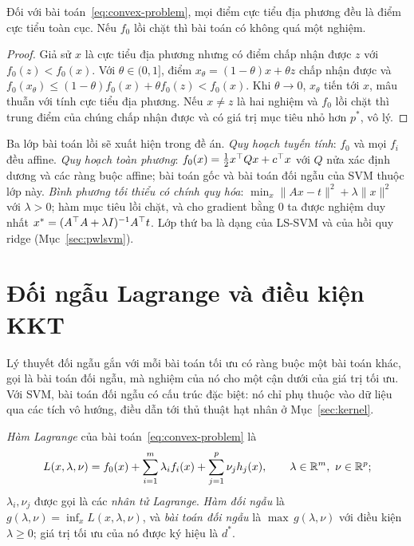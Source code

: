\begin{theorem}\label{thm:local-global}
Đối với bài toán~\eqref{eq:convex-problem}, mọi điểm cực tiểu địa phương đều là điểm cực tiểu toàn cục. Nếu $f_0$ lồi chặt thì bài toán có không quá một nghiệm.
\end{theorem}

\begin{proof}
Giả sử $x$ là cực tiểu địa phương nhưng có điểm chấp nhận được $z$ với $f_0(z)<f_0(x)$. Với $\theta\in(0,1]$, điểm $x_\theta=(1-\theta)x+\theta z$ chấp nhận được và $f_0(x_\theta)\le(1-\theta)f_0(x)+\theta f_0(z)<f_0(x)$. Khi $\theta\to0$, $x_\theta$ tiến tới $x$, mâu thuẫn với tính cực tiểu địa phương. Nếu $x\neq z$ là hai nghiệm và $f_0$ lồi chặt thì trung điểm của chúng chấp nhận được và có giá trị mục tiêu nhỏ hơn $p^\ast$, vô lý.
\end{proof}

Ba lớp bài toán lồi sẽ xuất hiện trong đề án. \emph{Quy hoạch tuyến tính}: $f_0$ và mọi $f_i$ đều affine. \emph{Quy hoạch toàn phương}: $f_0(x)=\frac12x^\top Qx+c^\top x$ với $Q$ nửa xác định dương và các ràng buộc affine; bài toán gốc và bài toán đối ngẫu của SVM thuộc lớp này. \emph{Bình phương tối thiểu có chính quy hóa}: $\min_x\|Ax-t\|^2+\lambda\|x\|^2$ với $\lambda>0$; hàm mục tiêu lồi chặt, và cho gradient bằng $0$ ta được nghiệm duy nhất $x^\ast=(A^\top A+\lambda I)^{-1}A^\top t$. Lớp thứ ba là dạng của LS-SVM và của hồi quy ridge (Mục~\ref{sec:pwlsvm}).

\section{Đối ngẫu Lagrange và điều kiện KKT}\label{sec:duality}

Lý thuyết đối ngẫu gắn với mỗi bài toán tối ưu có ràng buộc một bài toán khác, gọi là bài toán đối ngẫu, mà nghiệm của nó cho một cận dưới của giá trị tối ưu. Với SVM, bài toán đối ngẫu có cấu trúc đặc biệt: nó chỉ phụ thuộc vào dữ liệu qua các tích vô hướng, điều dẫn tới thủ thuật hạt nhân ở Mục~\ref{sec:kernel}.

\begin{definition}\label{def:lagrangian}
\emph{Hàm Lagrange} của bài toán~\eqref{eq:convex-problem} là
\[
L(x,\lambda,\nu)=f_0(x)+\sum_{i=1}^{m}\lambda_if_i(x)+\sum_{j=1}^{p}\nu_jh_j(x),\qquad\lambda\in\R^m,\ \nu\in\R^p;
\]
$\lambda_i,\nu_j$ được gọi là các \emph{nhân tử Lagrange}. \emph{Hàm đối ngẫu} là $g(\lambda,\nu)=\inf_xL(x,\lambda,\nu)$, và \emph{bài toán đối ngẫu} là $\max\,g(\lambda,\nu)$ với điều kiện $\lambda\ge0$; giá trị tối ưu của nó được ký hiệu là $d^\ast$.
\end{definition}

